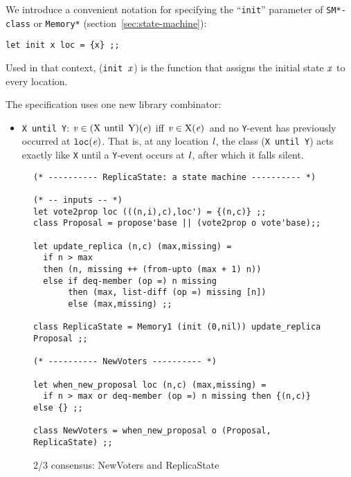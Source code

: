 \documentclass[final]{article}
\newcommand{\dgclassrel}[3]{\NUPRLclassrel{}{#1}{}{#2}{#3}}
\newcommand{\vXe}%
 {\ensuremath{\dgclassrel{\NUPRLevent}{\text{\lstinline{X}}}{\NUPRL{v}}}}
\begin{document}

We introduce a convenient notation for specifying the
``\lstinline{init}'' parameter of \lstinline{SM*-class} or
\lstinline{Memory*} (section~\ref{sec:state-machine}):
\begin{emlcode}
\begin{lstlisting}
let init x loc = {x} ;;
\end{lstlisting}
\end{emlcode}
Used in that context, (\lstinline{init}~$\mathit{x}$) is the function
that assigns the initial state $\mathit{x}$ to every location.



The specification uses one new library combinator:
\begin{itemize}
\item
\lstinline{X until Y}:%
%
%
$\dgclassrel{\NUPRLevent}{\text{(\lstinline{X until Y})}}{\NUPRL{v}}$
iff \vXe\ and no \lstinline{Y}-event has previously occurred at
$\mathtt{loc}(\mathit{e})$.  That is, at any location $\mathit{l}$,
the class (\lstinline{X until Y}) acts exactly like \lstinline{X} until
a \lstinline{Y}-event occurs at $\mathit{l}$, after which it falls
silent.

\end{itemize}

\begin{figure}[!t]
  \begin{lstlisting}[basicstyle=\small]
(* ---------- ReplicaState: a state machine ---------- *)

(* -- inputs -- *)
let vote2prop loc (((n,i),c),loc') = {(n,c)} ;;
class Proposal = propose'base || (vote2prop o vote'base);;

let update_replica (n,c) (max,missing) =
  if n > max
  then (n, missing ++ (from-upto (max + 1) n))
  else if deq-member (op =) n missing
       then (max, list-diff (op =) missing [n])
       else (max,missing) ;;

class ReplicaState = Memory1 (init (0,nil)) update_replica Proposal ;;

(* ---------- NewVoters ---------- *)

let when_new_proposal loc (n,c) (max,missing) =
  if n > max or deq-member (op =) n missing then {(n,c)} else {} ;;

class NewVoters = when_new_proposal o (Proposal, ReplicaState) ;;
  \end{lstlisting}
  \caption{2/3 consensus: NewVoters and ReplicaState}
  \label{fig:simple-consensus-replicastate}
\end{figure}
\end{document}
